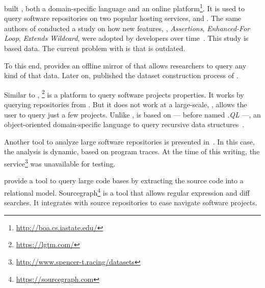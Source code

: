 \cite{dyerBoaLanguageInfrastructure2013,dyerDeclarativeVisitorsEase2013} built \boa{}, both a domain-specific language and an online platform\footnote{\url{http://boa.cs.iastate.edu/}}. 
It is used to query software repositories on two popular hosting services, \github{} and \sourceforge{}.
The same authors of \boa{} conducted a study on
how new \java{} features, \eg,
\emph{Assertions},
\emph{Enhanced-For Loop},
\emph{Extends Wildcard},
were adopted by developers over time~\citep{dyerMiningBillionsAST2014}.
This study is based \sourceforge{} data.
The current problem with \sourceforge{} is that is outdated.

To this end, \cite{gousiosGHTorentDatasetTool2013} provides an offline mirror of \github{} that allows researchers to query any kind of that data.
Later on, \cite{gousiosLeanGHTorrentGitHub2014} published the dataset construction process of \github{}.

Similar to \boa{}, \lgtm{}\footnote{\url{https://lgtm.com/}} is a platform to query software projects properties.
It works by querying repositories from \github{}.
But it does not work at a large-scale, \ie{}, \lgtm{} allows the user to query just a few projects.
Unlike \boa{}, \lgtm{} is based on \ql{}
--- before named \emph{.QL} ---,
an object-oriented domain-specific language to query recursive data structures~\cite{avgustinovQLObjectorientedQueries2016}.


Another tool to analyze large software repositories is presented in~\cite{brandauerSpencerInteractiveHeap2017}.
In this case, the analysis is dynamic, based on program traces. 
At the time of this writing, the service\footnote{\url{http://www.spencer-t.racing/datasets}} was unavailable for testing. 

\cite{bajracharyaSourcererInternetscaleSoftware2009} provide a tool to query large code bases by extracting the source code into a relational model.
Sourcegraph\footnote{\url{https://sourcegraph.com}} is a tool that allows regular expression and diff searches.
It integrates with source repositories to ease navigate software projects.


